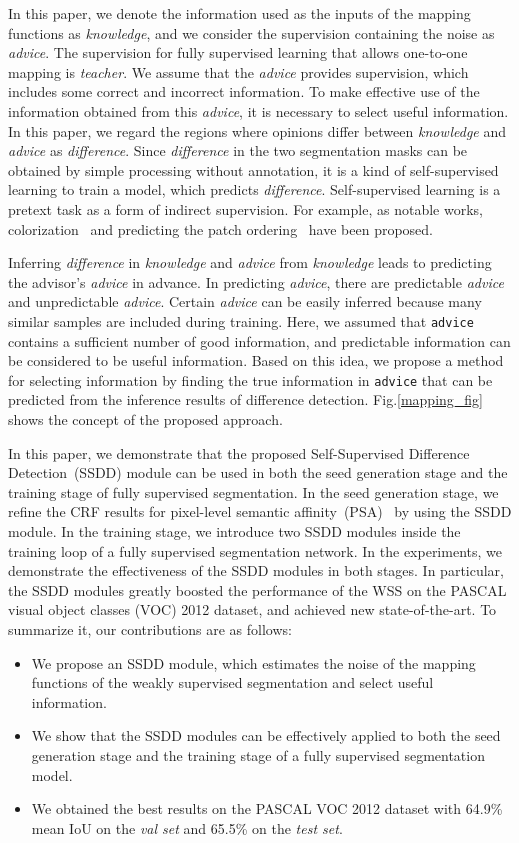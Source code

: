 \documentclass[10pt,twocolumn,letterpaper]{article}
\begin{document}
In this paper, we denote the information used as the inputs of the mapping functions as {\it knowledge}, and we consider the supervision containing the noise as {\it advice}. 
The supervision for fully supervised learning that allows one-to-one mapping is {\it teacher}.
We assume that the {\it advice} provides  supervision,  which  includes  some  correct  and incorrect information.
To make effective use of the information obtained from this {\it advice}, it is necessary to select useful information. 
In this paper, we regard the regions where opinions differ between {\it knowledge} and {\it advice} as {\it difference}.
Since {\it difference} in the two segmentation masks can be obtained by simple processing without annotation, it is a kind of self-supervised learning to train a model, which predicts {\it difference}.
Self-supervised learning is a pretext task as a form of indirect supervision.
For example, as notable works, colorization~\cite{dcolor} and predicting the patch ordering~\cite{porder} have been proposed.

Inferring {\it difference} in {\it knowledge} and {\it advice} from {\it knowledge} leads to predicting the advisor's {\it advice} in advance. 
In predicting {\it advice}, there are predictable {\it advice} and unpredictable {\it advice}.
Certain {\it advice} can be easily inferred because many similar samples are included during training.
Here, we assumed that {\tt advice} contains a sufficient number of good information, and predictable information can be considered to be useful information.
Based on this idea, we propose a method for selecting information by finding the true
information in {\tt advice} 
that can be predicted from the inference results of difference detection. 
Fig.\ref{mapping_fig} shows the concept of the proposed approach.

In this paper, we demonstrate that the proposed Self-Supervised Difference Detection~(SSDD) module can be used in both the seed generation stage and the training stage of fully supervised segmentation.
In the seed generation stage,
we refine the CRF results for pixel-level semantic affinity~(PSA)~\cite{psa} by using the SSDD module.
In the training stage, 
we introduce two SSDD modules inside the training loop of a fully supervised segmentation network.
In the experiments, we demonstrate the effectiveness of the SSDD modules in both stages.
In particular, the SSDD modules greatly boosted the performance of the WSS on the PASCAL visual object classes (VOC) 2012 dataset, and achieved new state-of-the-art.
To summarize it, our contributions are as follows:
\begin{itemize}
\item 
We propose an SSDD module, which estimates the noise of the mapping functions of the weakly supervised segmentation and select useful information. 
\item We show that the SSDD modules can be effectively applied to both the seed generation stage and
the training stage of a fully supervised segmentation model.
\item We obtained the best results on the PASCAL VOC 2012 dataset 
with 64.9\% mean IoU on the {\it val set} and 65.5\% on the {\it test set}.
\end{itemize}
\end{document}
